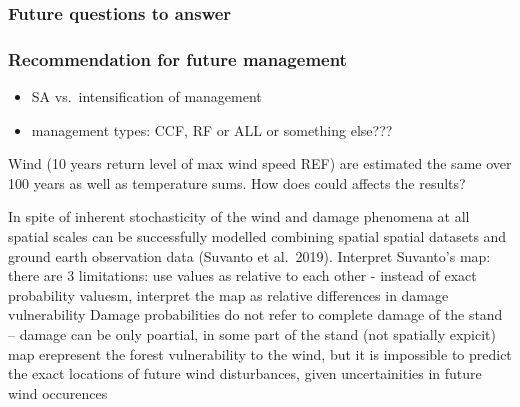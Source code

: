 \documentclass[]{elsarticle} %
\providecommand{\tightlist}{%
  \setlength{\itemsep}{0pt}\setlength{\parskip}{0pt}}
\begin{document}
\hypertarget{future-questions-to-answer}{%
\subsubsection{Future questions to answer}\label{future-questions-to-answer}}

\hypertarget{recommendation-for-future-management}{%
\subsubsection{Recommendation for future management}\label{recommendation-for-future-management}}

\begin{itemize}
\tightlist
\item
  SA vs.~intensification of management
\item
  management types: CCF, RF or ALL or something else???
\end{itemize}

Wind (10 years return level of max wind speed REF) are estimated the same over 100 years as well as temperature sums. How does could affects the results?

In spite of inherent stochasticity of the wind and damage phenomena at all spatial scales can be successfully modelled combining spatial spatial datasets and ground earth observation data (Suvanto et al.~2019).
Interpret Suvanto's map: there are 3 limitations:
use values as relative to each other - instead of exact probability valuesm, interpret the map as relative differences in damage vulnerability
Damage probabilities do not refer to complete damage of the stand -- damage can be only poartial, in some part of the stand (not spatially expicit)
map erepresent the forest vulnerability to the wind, but it is impossible to predict the exact locations of future wind disturbances, given uncertainities in future wind occurences
\end{document}

